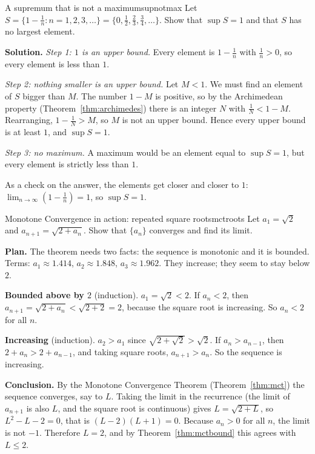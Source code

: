 \documentclass[11pt]{article}
\begin{document}
\begin{exmp}{A supremum that is not a maximum}{supnotmax}
Let $S=\{1-\tfrac1n : n=1,2,3,\dots\}=\{0,\tfrac12,\tfrac23,\tfrac34,\dots\}$. Show that $\sup S=1$ and that $S$ has no largest element.

\textbf{Solution.} \emph{Step 1: $1$ is an upper bound.} Every element is $1-\frac1n$ with $\frac1n>0$, so every element is less than $1$.

\emph{Step 2: nothing smaller is an upper bound.} Let $M<1$. We must find an element of $S$ bigger than $M$. The number $1-M$ is positive, so by the Archimedean property (Theorem~\ref{thm:archimedes}) there is an integer $N$ with $\frac1N<1-M$. Rearranging, $1-\frac1N>M$, so $M$ is not an upper bound. Hence every upper bound is at least $1$, and $\sup S=1$.

\emph{Step 3: no maximum.} A maximum would be an element equal to $\sup S=1$, but every element is strictly less than $1$.

As a check on the answer, the elements get closer and closer to $1$: $\lim_{n\to\infty}\left(1-\tfrac1n\right)=1$, so $\sup S=1$.
\end{exmp}

\begin{exmp}{Monotone Convergence in action: repeated square roots}{mctroots}
Let $a_1=\sqrt2$ and $a_{n+1}=\sqrt{2+a_n}$. Show that $\{a_n\}$ converges and find its limit.

\textbf{Plan.} The theorem needs two facts: the sequence is monotonic and it is bounded. Terms: $a_1\approx1.414$, $a_2\approx1.848$, $a_3\approx1.962$. They increase; they seem to stay below $2$.

\textbf{Bounded above by $2$} (induction). $a_1=\sqrt2<2$. If $a_n<2$, then $a_{n+1}=\sqrt{2+a_n}<\sqrt{2+2}=2$, because the square root is increasing. So $a_n<2$ for all $n$.

\textbf{Increasing} (induction). $a_2>a_1$ since $\sqrt{2+\sqrt2}>\sqrt2$. If $a_n>a_{n-1}$, then $2+a_n>2+a_{n-1}$, and taking square roots, $a_{n+1}>a_n$. So the sequence is increasing.

\textbf{Conclusion.} By the Monotone Convergence Theorem (Theorem~\ref{thm:mct}) the sequence converges, say to $L$. Taking the limit in the recurrence (the limit of $a_{n+1}$ is also $L$, and the square root is continuous) gives $L=\sqrt{2+L}$, so $L^2-L-2=0$, that is $(L-2)(L+1)=0$.
Because $a_n>0$ for all $n$, the limit is not $-1$. Therefore $L=2$, and by Theorem~\ref{thm:mctbound} this agrees with $L\le 2$.
\end{exmp}
\end{document}
